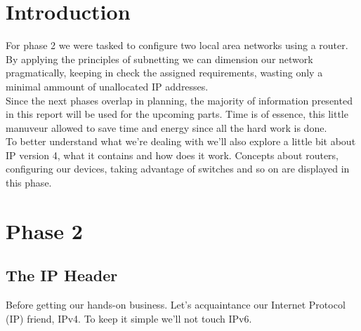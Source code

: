 \documentclass[11pt,a4paper]{report}
\begin{document}
\chapter{Introduction}
    \pagestyle{fancy}
    For phase 2 we were tasked to configure two local area networks using a router. By applying the principles of subnetting we can dimension our network pragmatically, keeping in check the assigned requirements, wasting only a minimal ammount of unallocated IP addresses.\\
    Since the next phases overlap in planning, the majority of information presented in this report will be used for the upcoming parts. Time is of essence, this little manuveur allowed to save time and energy since all the hard work is done.\\
    To better understand what we're dealing with we'll also explore a little bit about IP version 4, what it contains and how does it work. Concepts about routers, configuring our devices, taking advantage of switches and so on are displayed in this phase.\\

    \setcounter{page}{1}

\chapter{Phase 2}
    \section{The IP Header}
        Before getting our hands-on business. Let's acquaintance our Internet Protocol (IP) friend, IPv4. To keep it simple we'll not touch IPv6.
\end{document}
